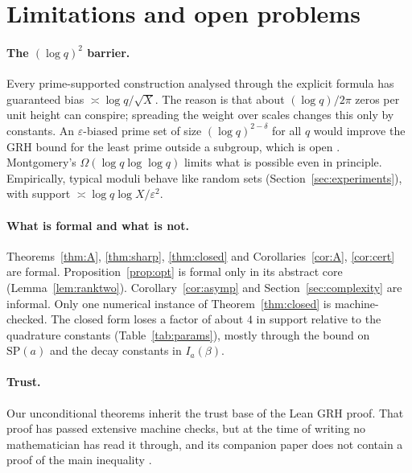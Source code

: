 \section{Limitations and open problems}\label{sec:limits}

\paragraph{The $(\log q)^2$ barrier.}
Every prime-supported construction analysed through the explicit formula has guaranteed bias
$\asymp\log q/\sqrt X$. The reason is that about $(\log q)/2\pi$ zeros per unit height can conspire;
spreading the weight over scales changes this only by constants. An $\varepsilon$-biased prime set of size
$(\log q)^{2-\delta}$ for all $q$ would improve the GRH bound for the least prime outside a subgroup, which is
open \cite{lls2015,cmqr2024}. Montgomery's $\Omega(\log q\log\log q)$ \cite{montgomery1971} limits what is
possible even in principle. Empirically, typical moduli behave like random sets (Section~\ref{sec:experiments}),
with support $\asymp\log q\log X/\varepsilon^2$.

\paragraph{What is formal and what is not.}
Theorems~\ref{thm:A}, \ref{thm:sharp}, \ref{thm:closed} and Corollaries~\ref{cor:A}, \ref{cor:cert} are formal.
Proposition~\ref{prop:opt} is formal only in its abstract core (Lemma~\ref{lem:ranktwo}). Corollary~\ref{cor:asymp}
and Section~\ref{sec:complexity} are informal. Only one numerical instance of Theorem~\ref{thm:closed} is
machine-checked. The closed form loses a factor of about $4$ in support relative to the quadrature constants
(Table~\ref{tab:params}), mostly through the bound on $\mathrm{SP}(a)$ and the decay constants in $I_a(\beta)$.

\paragraph{Trust.}
Our unconditional theorems inherit the trust base of the Lean GRH proof. That proof has passed extensive
machine checks, but at the time of writing no mathematician has read it through, and its companion paper
does not contain a proof of the main inequality \cite{rubinsteinpage}.

